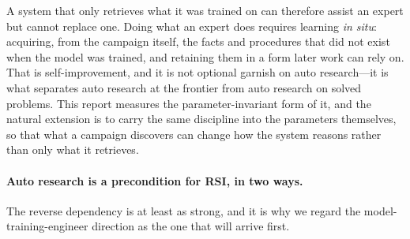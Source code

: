 A system that only retrieves what it was trained on can therefore assist an expert
but cannot replace one. Doing what an expert does requires learning \emph{in situ}:
acquiring, from the campaign itself, the facts and procedures that did not exist when
the model was trained, and retaining them in a form later work can rely on. That is
self-improvement, and it is not optional garnish on auto research---it is what
separates auto research at the frontier from auto research on solved problems. This
report measures the parameter-invariant form of it, and the natural extension is to
carry the same discipline into the parameters themselves, so that what a campaign
discovers can change how the system reasons rather than only what it retrieves.

\paragraph{Auto research is a precondition for RSI, in two ways.}
The reverse dependency is at least as strong, and it is why we regard the
model-training-engineer direction as the one that will arrive first.

